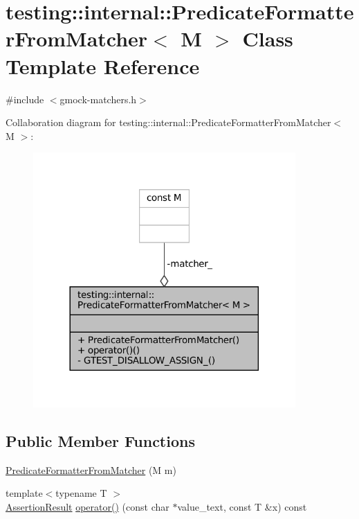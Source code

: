 \hypertarget{classtesting_1_1internal_1_1PredicateFormatterFromMatcher}{}\section{testing\+:\+:internal\+:\+:Predicate\+Formatter\+From\+Matcher$<$ M $>$ Class Template Reference}
\label{classtesting_1_1internal_1_1PredicateFormatterFromMatcher}


{\ttfamily \#include $<$gmock-\/matchers.\+h$>$}



Collaboration diagram for testing\+:\+:internal\+:\+:Predicate\+Formatter\+From\+Matcher$<$ M $>$\+:
\nopagebreak
\begin{figure}[H]
\begin{center}
\leavevmode
\includegraphics[width=284pt]{classtesting_1_1internal_1_1PredicateFormatterFromMatcher__coll__graph}
\end{center}
\end{figure}
\subsection*{Public Member Functions}
\begin{DoxyCompactItemize}
\item 
\hyperlink{classtesting_1_1internal_1_1PredicateFormatterFromMatcher_aa0c40eca009c31e25738520dea0bc98c}{Predicate\+Formatter\+From\+Matcher} (M m)
\item 
{\footnotesize template$<$typename T $>$ }\\\hyperlink{classtesting_1_1AssertionResult}{Assertion\+Result} \hyperlink{classtesting_1_1internal_1_1PredicateFormatterFromMatcher_a51d28bee5f86347ea34b7a0f2758b599}{operator()} (const char $\ast$value\+\_\+text, const T \&x) const
\end{DoxyCompactItemize}
